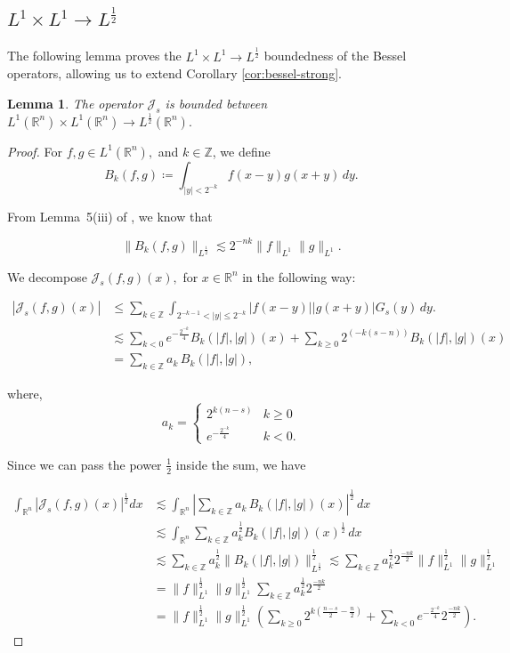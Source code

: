 \documentclass[12pt]{article}
\newtheorem{lemma}[theorem]{Lemma}
\theoremstyle{definition}
\theoremstyle{remark}
\numberwithin{equation}{section}
\begin{document}
\subsection{$L^1\times L^1\to L^{\frac{1}{2}}$}
The following lemma proves the $L^1\times L^1\to L^{\frac{1}{2}}$ boundedness of the Bessel operators, allowing us to extend Corollary \ref{cor:bessel-strong}.
\begin{lemma}
The operator $\mathcal{J}_s$ is bounded between $L^1(\mathbb{R}^n)\times L^1(\mathbb{R}^n)\to L^\frac{1}{2}(\mathbb{R}^n).$
\end{lemma}
\begin{proof}
 

For $f, g \in L^1(\mathbb{R}^n), $ and $k\in \mathbb{Z}$, we define
\[
B_k(f,g)\coloneq \int_{|y|<2^{-k}}f(x-y)g(x+y)\, dy.
\]

From Lemma~5(iii) of \cite{KenSte}, we know that

\[
\|B_k(f,g)\|_{L^{\frac{1}{2}}}\lesssim 2^{-nk}\|f\|_{L^1}\|g\|_{L^1}.
\]

We decompose  $\mathcal{J}_s(f,g)(x),$ for $x\in \mathbb{R}^n$ in the following way:

\begin{align*}
    |\mathcal{J}_s(f,g)(x)| &\leq \sum_{k\in \mathbb{Z}} \int_{2^{-k-1}<|y|\leq 2^{-k}}|f(x-y)||g(x+y)|G_s(y) \, dy. \\
    &\lesssim\sum_{k< 0} e^{-\frac{2^{-k}}{4}}B_k(|f|,|g|)(x)+ \sum_{k\geq 0} 2^{(-k(s-n))}B_k(|f|,|g|)(x) \\
    &=\sum_{k\in \mathbb{Z}} a_k \, B_k(|f|,|g|),
\end{align*}

where, \[ a_k = \begin{cases} 
          2^{k(n-s)} & k\geq 0 \\
          e^{-\frac{2^{-k}}{4}} & k< 0. 
       \end{cases}
    \]

Since we can pass the power $\frac{1}{2}$ inside the sum, we have 


\begin{align*}
\int_{\mathbb{R}^n}|\mathcal{J}_s(f,g)(x)|^{\frac12}dx &\lesssim \int_{\mathbb{R}^n} \left|\sum_{k\in \mathbb{Z}}a_k  \, B_k(|f|,|g|)(x)\right|^\frac{1}{2} \, dx \\&\lesssim \int_{\mathbb{R}^n}\sum_{k\in \mathbb{Z}}a_k^{\frac{1}{2}} B_k(|f|,|g|)(x)^{\frac{1}{2}}\, dx \\
&\lesssim \sum_{k\in \mathbb{Z}}a_k^{\frac{1}{2}} \|B_k(|f|,|g|)\|_{L^{\frac{1}{2}}}^{\frac12} \lesssim \sum_{k\in \mathbb{Z}}a_k^{\frac{1}{2}} 2^{\frac{-nk}{2}}\|f\|^{\frac12}_{L^1}\|g\|^{\frac12}_{L^1} \\
&=\|f\|_{L^1}^{\frac12}\|g\|_{L^1}^{\frac12} \sum_{k\in \mathbb{Z}}a_k^{\frac{1}{2}}2^{\frac {-nk}{2}} \\
&=\|f\|_{L^1}^{\frac{1}{2}}\|g\|_{L^1}^{\frac12} \left(\sum_{k\geq 0} 2^{k(\frac{n-s}{2}-\frac{n}{2})}  + \sum_{k<0} e^{-\frac{2^{-k}}{4}}2^{\frac{-nk}{2}}\right).
\end{align*}


\end{proof}
\end{document}
